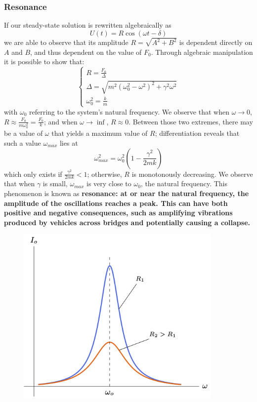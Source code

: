 \documentclass{article}
\begin{document}
\subsubsection{Resonance}
If our steady-state solution is rewritten algebraically as 
\begin{equation*}
    U(t) = R\cos (\omega t - \delta)
\end{equation*}
we are able to observe that its amplitude $R = \sqrt{A^2 + B^2}$ is dependent directly on $A$ and $B$, and thus dependent on the value of $F_0$. Through algebraic manipulation it is possible to show that:
\begin{equation*}
    \begin{cases}
        R = \frac{F_0}{\Delta} \\
        \Delta = \sqrt{m^2(\omega_0^2 -\omega^2)^2 + \gamma^2\omega^2} \\
        \omega_0^2 = \frac{k}{m}
    \end{cases}
\end{equation*}
with $\omega_0$ referring to the system's natural frequency. We observe that when $\omega \to 0$, $R \approx \frac{F_0}{m\omega_0^2} = \frac{F_0}{k}$; and when $\omega \to \inf$, $R \approx 0$. Between those two extremes, there may be a value of $\omega$ that yields a maximum value of $R$; differentiation reveals that such a value $\omega_{max}$ lies at 
\begin{equation*}
    \omega_{max}^2 = \omega_0^2(1-\frac{\gamma^2}{2mk})
\end{equation*}
which only exists if $\frac{\gamma^2}{2mk} < 1$; otherwise, $R$ is monotonously decreasing. We observe that when $\gamma$ is small, $\omega_{max}$ is very close to $\omega_0$, the natural frequency. This phenomenon is known as \bf resonance\normalfont: at or near the natural frequency, the amplitude of the oscillations reaches a peak. This can have both positive and negative consequences, such as amplifying vibrations produced by vehicles across bridges and potentially causing a collapse.
\begin{figure}[h]
    \centering
    \includegraphics[width=10cm]{DE-ch3-resonance.png}
\end{figure}
\end{document}
